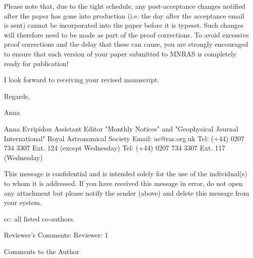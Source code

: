 \documentclass[10pt,a4paper]{article}
\begin{document}
Please note that, due to the tight schedule, any post-acceptance changes notified
after the paper has gone into production (i.e. the day after the acceptance email is
sent) cannot be incorporated into the paper before it is typeset. Such changes will
therefore need to be made as part of the proof corrections. To avoid excessive proof
corrections and the delay that these can cause, you are strongly encouraged to
ensure that each version of your paper submitted to MNRAS is completely ready for
publication!

I look forward to receiving your revised manuscript.

Regards,

Anna

Anna Evripidou
Assistant Editor
"Monthly Notices" and "Geophysical Journal International"
Royal Astronomical Society
Email: ae@ras.org.uk
Tel: (+44) 0207 734 3307 Ext. 124 (except Wednesday)
Tel: (+44) 0207 734 3307 Ext. 117 (Wednesday)


This message is confidential and is intended solely for the use of the individual(s)
to whom it is addressed.  If you have received this message in error, do not open
any attachment but please notify the sender (above) and delete this message from
your system.

cc: all listed co-authors.


Reviewer's Comments:
Reviewer: 1

Comments to the Author
\end{document}
